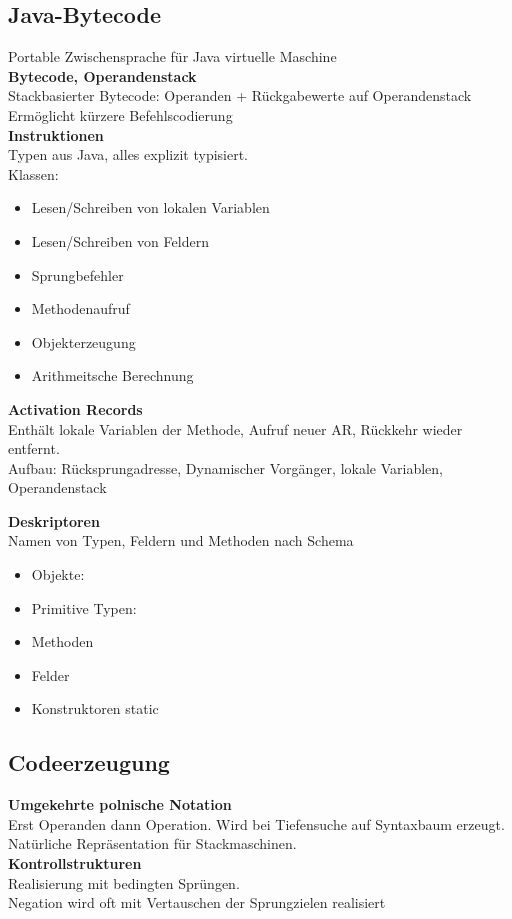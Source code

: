 \subsection{Java-Bytecode}%
\label{cmp:sub:java-bytecode}
Portable Zwischensprache für Java virtuelle Maschine\\

\textbf{Bytecode, Operandenstack}\\
Stackbasierter Bytecode: Operanden + Rückgabewerte auf Operandenstack\\
Ermöglicht kürzere Befehlscodierung\\

\textbf{Instruktionen}\\
Typen aus Java, alles explizit typisiert.\\
Klassen:
\begin{itemize}
\item Lesen/Schreiben von lokalen Variablen
\item Lesen/Schreiben von Feldern
\item Sprungbefehler
\item Methodenaufruf
\item Objekterzeugung
\item Arithmeitsche Berechnung
\end{itemize}

\textbf{Activation Records}\\
Enthält lokale Variablen der Methode, Aufruf neuer AR, Rückkehr wieder entfernt.\\
Aufbau: Rücksprungadresse, Dynamischer Vorgänger, lokale Variablen, Operandenstack

\textbf{Deskriptoren}\\
Namen von Typen, Feldern und Methoden nach Schema
\begin{itemize}
\item Objekte: 
\item Primitive Typen: 
\item Methoden 
\item Felder 
\item Konstruktoren  static 
\end{itemize}

\subsection{Codeerzeugung}%
\label{cmp:sub:codeerzeugung}
\textbf{Umgekehrte polnische Notation}\\
Erst Operanden dann Operation. Wird bei Tiefensuche auf Syntaxbaum erzeugt.
Natürliche Repräsentation für Stackmaschinen.\\

\textbf{Kontrollstrukturen}\\
Realisierung mit bedingten Sprüngen.\\
Negation wird oft mit Vertauschen der Sprungzielen realisiert
